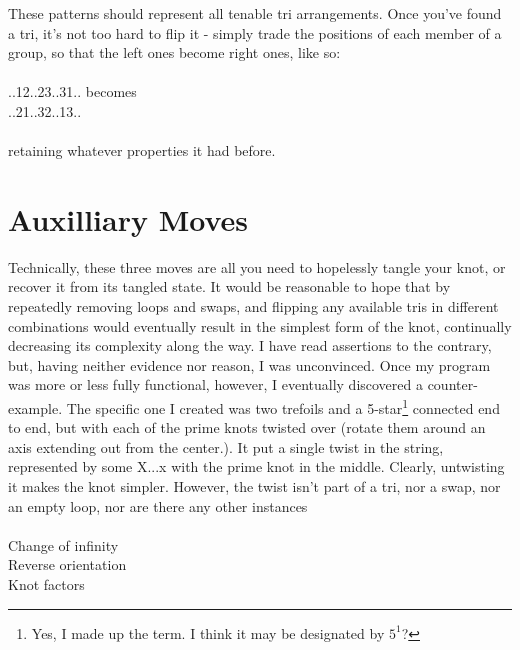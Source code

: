 \documentclass[twoside]{report}
\begin{document}
These patterns should represent all tenable tri arrangements.  Once you've found a tri, it's not too hard to flip it - simply trade the positions of each member of a group, so that the left ones become right ones, like so:\\\\
..12..23..31.. becomes\\
..21..32..13..\\\\
retaining whatever properties it had before.

\section{Auxilliary Moves}
Technically, these three moves are all you need to hopelessly tangle your knot, or recover it from its tangled state.  It would be reasonable to hope that by repeatedly removing loops and swaps, and flipping any available tris in different combinations would eventually result in the simplest form of the knot, continually decreasing its complexity along the way.  I have read assertions to the contrary, but, having neither evidence nor reason, I was unconvinced.  Once my program was more or less fully functional, however, I eventually discovered a counter-example.  The specific one I created was two trefoils and a 5-star\footnote{Yes, I made up the term.  I think it may be designated by $5^1$?} connected end to end, but with each of the prime knots twisted over (rotate them around an axis extending out from the center.).  It put a single twist in the string, represented by some X...x with the prime knot in the middle.  Clearly, untwisting it makes the knot simpler.  However, the twist isn't part of a tri, nor a swap, nor an empty loop, nor are there any other instances \\
\\
Change of infinity\\
Reverse orientation\\
Knot factors\\
\end{document}
